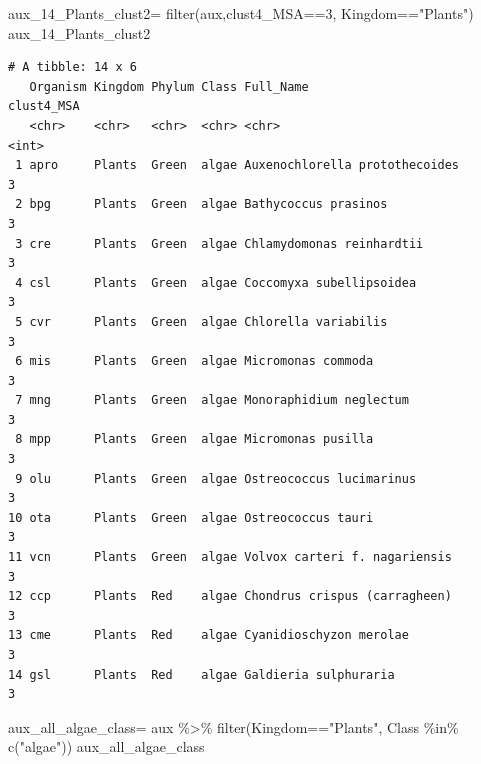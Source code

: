 \documentclass[
  letterpaper,
  DIV=11,
  numbers=noendperiod]{scrreprt}
\newenvironment{Shaded}{}{}
\newcommand{\DecValTok}[1]{\textcolor[rgb]{0.82,0.60,0.40}{#1}}
\newcommand{\FunctionTok}[1]{\textcolor[rgb]{0.38,0.69,0.94}{#1}}
\newcommand{\NormalTok}[1]{\textcolor[rgb]{0.67,0.70,0.75}{#1}}
\newcommand{\OtherTok}[1]{\textcolor[rgb]{0.15,0.68,0.38}{#1}}
\newcommand{\SpecialCharTok}[1]{\textcolor[rgb]{0.34,0.71,0.76}{#1}}
\newcommand{\StringTok}[1]{\textcolor[rgb]{0.60,0.76,0.47}{#1}}
\begin{document}
\begin{Shaded}
\begin{Highlighting}[]
\NormalTok{aux\_14\_Plants\_clust2}\OtherTok{=} \FunctionTok{filter}\NormalTok{(aux,clust4\_MSA}\SpecialCharTok{==}\DecValTok{3}\NormalTok{,}
\NormalTok{                             Kingdom}\SpecialCharTok{==}\StringTok{"Plants"}\NormalTok{)}
\NormalTok{aux\_14\_Plants\_clust2}
\end{Highlighting}
\end{Shaded}

\begin{verbatim}
# A tibble: 14 x 6
   Organism Kingdom Phylum Class Full_Name                      clust4_MSA
   <chr>    <chr>   <chr>  <chr> <chr>                               <int>
 1 apro     Plants  Green  algae Auxenochlorella protothecoides          3
 2 bpg      Plants  Green  algae Bathycoccus prasinos                    3
 3 cre      Plants  Green  algae Chlamydomonas reinhardtii               3
 4 csl      Plants  Green  algae Coccomyxa subellipsoidea                3
 5 cvr      Plants  Green  algae Chlorella variabilis                    3
 6 mis      Plants  Green  algae Micromonas commoda                      3
 7 mng      Plants  Green  algae Monoraphidium neglectum                 3
 8 mpp      Plants  Green  algae Micromonas pusilla                      3
 9 olu      Plants  Green  algae Ostreococcus lucimarinus                3
10 ota      Plants  Green  algae Ostreococcus tauri                      3
11 vcn      Plants  Green  algae Volvox carteri f. nagariensis           3
12 ccp      Plants  Red    algae Chondrus crispus (carragheen)           3
13 cme      Plants  Red    algae Cyanidioschyzon merolae                 3
14 gsl      Plants  Red    algae Galdieria sulphuraria                   3
\end{verbatim}

\begin{Shaded}
\begin{Highlighting}[]
\NormalTok{aux\_all\_algae\_class}\OtherTok{=}\NormalTok{ aux }\SpecialCharTok{\%\textgreater{}\%} 
  \FunctionTok{filter}\NormalTok{(Kingdom}\SpecialCharTok{==}\StringTok{"Plants"}\NormalTok{,}
\NormalTok{         Class }\SpecialCharTok{\%in\%} \FunctionTok{c}\NormalTok{(}\StringTok{"algae"}\NormalTok{))}
\NormalTok{aux\_all\_algae\_class}
\end{Highlighting}
\end{Shaded}
\end{document}
